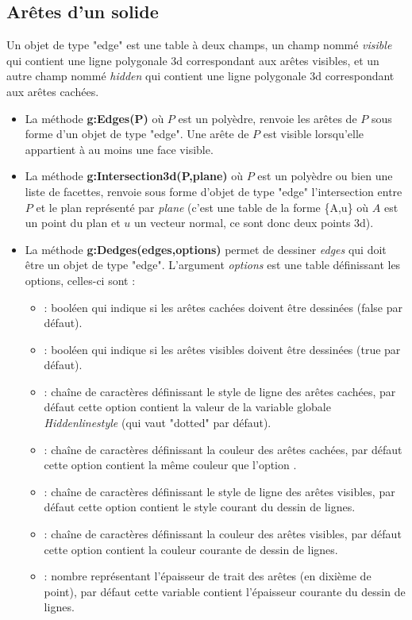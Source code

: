 \subsection{Arêtes d'un solide}

Un objet de type "edge" est une table à deux champs, un champ nommé \emph{visible} qui contient une ligne polygonale 3d correspondant aux arêtes visibles, et un autre champ nommé \emph{hidden} qui contient une ligne polygonale 3d correspondant aux arêtes cachées.

\begin{itemize}
    \item La méthode \textbf{g:Edges(P)} où $P$ est un polyèdre, renvoie les arêtes de $P$ sous forme d'un objet de type "edge". Une arête de $P$ est visible lorsqu'elle appartient à au moins une face visible.
    \item La méthode \textbf{g:Intersection3d(P,plane)} où $P$ est un polyèdre ou bien une liste de facettes, renvoie sous forme d'objet de type "edge" l'intersection entre $P$ et le plan représenté par \emph{plane} (c'est une table de la forme \{A,u\} où $A$ est un point du plan et $u$ un vecteur normal, ce sont donc deux points 3d).
    \item La méthode \textbf{g:Dedges(edges,options)} permet de dessiner \emph{edges} qui doit être un objet de type "edge". L'argument \emph{options} est une table définissant les options, celles-ci sont :
    \begin{itemize}
        \item {} : booléen qui indique si les arêtes cachées doivent être dessinées (false par défaut).
        \item {} : booléen qui indique si les arêtes visibles doivent être dessinées (true par défaut).
        \item {} : chaîne de caractères définissant le style de ligne des arêtes cachées, par défaut cette option contient la valeur de la variable globale \emph{Hiddenlinestyle} (qui vaut "dotted" par défaut).
        \item {} : chaîne de caractères définissant la couleur des arêtes cachées, par défaut cette option contient la même couleur que l'option .
        \item {} : chaîne de caractères définissant le style de ligne des arêtes visibles, par défaut cette option contient le style courant du dessin de lignes.
        \item {} : chaîne de caractères définissant la couleur des arêtes visibles, par défaut cette option contient la couleur courante de dessin de lignes.
        \item {} : nombre représentant l'épaisseur de trait des arêtes (en dixième de point), par défaut cette variable contient l'épaisseur courante du dessin de lignes.
    \end{itemize}


\end{itemize}
